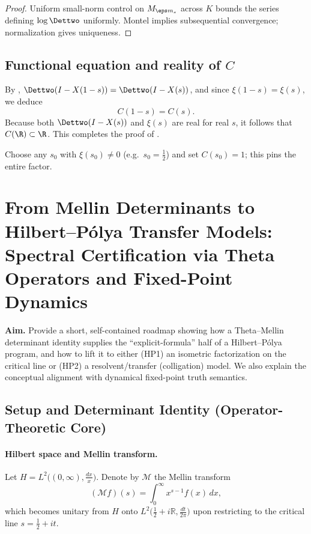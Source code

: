 \begin{proof}
Uniform small-norm control on \(M_{\eps m_s}\) across \(K\) bounds the series defining \(\log\Dettwo\) uniformly. Montel implies subsequential convergence; normalization gives uniqueness.
\end{proof}

\subsection{Functional equation and reality of \texorpdfstring{$C$}{C}}
By , \(\Dettwo(I-X(1-s))=\Dettwo(I-X(s))\), and since \(\xi(1-s)=\xi(s)\), we deduce
\begin{equation}\label{eq:Cfunctional}
C(1-s)=C(s).
\end{equation}
Because both \(\Dettwo(I-X(s))\) and \(\xi(s)\) are real for real \(s\), it follows that \(C(\R)\subset \R\). This completes the proof of .

\begin{remark}[Normalization]
Choose any \(s_0\) with \(\xi(s_0)\neq0\) (e.g.\ \(s_0=\tfrac12\)) and set \(C(s_0)=1\); this pins the entire factor.
\end{remark}

\section{From Mellin Determinants to Hilbert–Pólya Transfer Models:\\
Spectral Certification via Theta Operators and Fixed-Point Dynamics}
\label{sec:mellin_to_hp}

\noindent\textbf{Aim.}
Provide a short, self-contained roadmap showing how a Theta–Mellin determinant identity supplies the
``explicit-formula'' half of a Hilbert–Pólya program, and how to lift it to either
(HP1) an isometric factorization on the critical line or (HP2) a resolvent/transfer (colligation) model.
We also explain the conceptual alignment with dynamical fixed-point truth semantics.

\subsection{Setup and Determinant Identity (Operator-Theoretic Core)}

\paragraph{Hilbert space and Mellin transform.}
Let \(H=L^2\!\big((0,\infty),\frac{dx}{x}\big)\).
Denote by \(\mathcal{M}\) the Mellin transform
\[
(\mathcal{M}f)(s)=\int_0^\infty x^{s-1}f(x)\,dx,
\]
which becomes unitary from \(H\) onto \(L^2\!\big(\tfrac12+i\mathbb{R},\tfrac{dt}{2\pi}\big)\) upon restricting to the critical line \(s=\tfrac12+it\).

